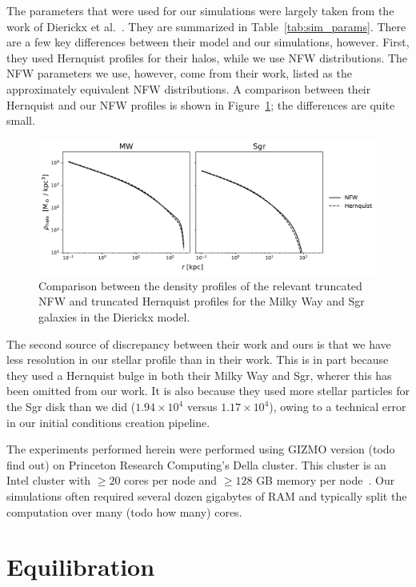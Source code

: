 The parameters that were used for our simulations were largely taken from the
work of Dierickx et al.~\cite{dierickx_predicted_2017}. They are summarized in
Table~\ref{tab:sim_params}. There are a few key differences between their model
and our simulations, however. First, they used Hernquist profiles for their
halos, while we use NFW distributions. The NFW parameters we use, however, come
from their work, listed as the approximately equivalent NFW distributions. A
comparison between their Hernquist and our NFW profiles is shown in
Figure~\ref{fig:nfw_vs_hernquist}; the differences are quite small.

\begin{figure}
    \centering
    \includegraphics[width=0.9\linewidth]{figs/nfw_vs_hernquist.pdf}
    \caption{%
        Comparison between the density profiles of the relevant truncated NFW
        and truncated Hernquist profiles for the Milky Way and Sgr galaxies in
        the Dierickx model.
    }
    \label{fig:nfw_vs_hernquist}
\end{figure}

The second source of discrepancy between their work and ours is that we have
less resolution in our stellar profile than in their work. This is in part
because they used a Hernquist bulge in both their Milky Way and Sgr, wherer this
has been omitted from our work. It is also because they used more stellar
particles for the Sgr disk than we did ($1.94 \times 10^4$ versus $1.17 \times
10^4$), owing to a technical error in our initial conditions creation
pipeline.

The experiments performed herein were performed using GIZMO version
(todo find out) on Princeton Research Computing's Della cluster. This
cluster is an Intel cluster with $\geq 20$ cores per node and $\geq
128$ GB memory per node~\cite{princeton_research_computing_della_nodate}. Our
simulations often required several dozen gigabytes of RAM and typically split
the computation over many (todo how many) cores.

\hypertarget{equilibration}{%
\section{Equilibration}\label{equilibration}}

